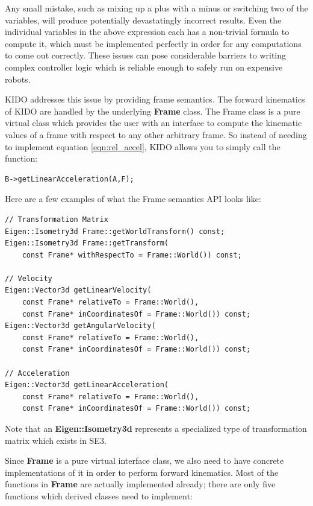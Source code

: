 Any small mistake, such as mixing up a plus with a minus or switching two of the variables, will produce potentially devastatingly incorrect results. Even the individual variables in the above expression each has a non-trivial formula to compute it, which must be implemented perfectly in order for any computations to come out correctly. These issues can pose considerable barriers to writing complex controller logic which is reliable enough to safely run on expensive robots.

KIDO addresses this issue by providing frame semantics. The forward kinematics of KIDO are handled by the underlying \textbf{Frame} class. The Frame class is a pure virtual class which provides the user with an interface to compute the kinematic values of a frame with respect to any other arbitrary frame. So instead of needing to implement equation \ref{eqn:rel_accel}, KIDO allows you to simply call the function:

\begin{lstlisting}
B->getLinearAcceleration(A,F);
\end{lstlisting}

Here are a few examples of what the Frame semantics API looks like:

\begin{lstlisting}
// Transformation Matrix
Eigen::Isometry3d Frame::getWorldTransform() const;
Eigen::Isometry3d Frame::getTransform(
    const Frame* withRespectTo = Frame::World()) const;

// Velocity
Eigen::Vector3d getLinearVelocity(
    const Frame* relativeTo = Frame::World(),
    const Frame* inCoordinatesOf = Frame::World()) const;
Eigen::Vector3d getAngularVelocity(
    const Frame* relativeTo = Frame::World(),
    const Frame* inCoordinatesOf = Frame::World()) const;
    
// Acceleration
Eigen::Vector3d getLinearAcceleration(
    const Frame* relativeTo = Frame::World(),
    const Frame* inCoordinatesOf = Frame::World()) const;
\end{lstlisting}

Note that an \textbf{Eigen::Isometry3d} represents a specialized type of transformation matrix which exists in SE3.

Since \textbf{Frame} is a pure virtual interface class, we also need to have concrete implementations of it in order to perform forward kinematics. Most of the functions in \textbf{Frame} are actually implemented already; there are only five functions which derived classes need to implement:

